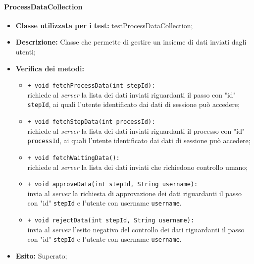 \paragraph{ProcessDataCollection}
\begin{flushleft}
\begin{itemize}
\item \textbf{Classe utilizzata per i test:} testProcessDataCollection;
\item \textbf{Descrizione:} Classe che permette di gestire un insieme di dati inviati dagli utenti;
\item \textbf{Verifica dei metodi:}
\begin{sloppypar}
\begin{itemize}
\item \texttt{+ void fetchProcessData(int stepId):}\\ richiede al \textit{server} la lista dei dati inviati riguardanti il passo con "id" \texttt{stepId}, ai quali l'utente identificato dai dati di sessione può accedere;
\item \texttt{+ void fetchStepData(int processId):}\\ richiede al \textit{server} la lista dei dati inviati riguardanti il processo con "id" \texttt{processId}, ai quali l'utente identificato dai dati di sessione può accedere;
\item \texttt{+ void fetchWaitingData():}\\ richiede al \textit{server} la lista dei dati inviati che richiedono controllo umano;
\item \texttt{+ void approveData(int stepId, String username):}\\ invia al \textit{server} la richiesta di approvazione dei dati riguardanti il passo con "id" \texttt{stepId} e l'utente con username \texttt{username}.
\item \texttt{+ void rejectData(int stepId, String username):}\\ invia al \textit{server} l'esito negativo del controllo dei dati riguardanti il passo con "id" \texttt{stepId} e l'utente con username \texttt{username}.
\end{itemize}
\end{sloppypar}
\item \textbf{Esito:} Superato;
\end{itemize}
\end{flushleft}


